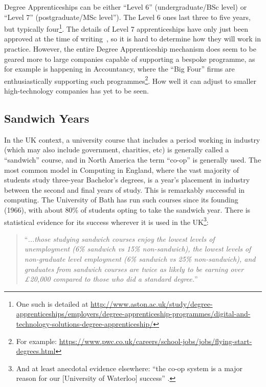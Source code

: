 \documentclass[conference]{IEEEtran}
\begin{document}
Degree Apprenticeships can be either ``Level 6'' (undergraduate/BSc
level) or ``Level 7'' (postgraduate/MSc level''). The Level 6 ones
last three to five years, but typically four\footnote{One such is
detailed at
\url{http://www.aston.ac.uk/study/degree-apprenticeships/employers/degree-apprenticeship-programmes/digital-and-technology-solutions-degree-apprenticeship/}}. The
details of Level 7 apprenticeships have only just been approved at the
time of writing~\cite{IfA2018a}, so it is hard to determine how they will work in
practice. However, the entire Degree Apprenticeship mechanism does
seem to be geared more to large companies capable of supporting a
bespoke programme, as for example is happening in Accountancy, where
the ``Big Four'' firms are enthusiastically supporting such
programmes\footnote{For example:
\url{https://www.pwc.co.uk/careers/school-jobs/jobs/flying-start-degrees.html}}. How
well it can adjust to smaller high-technology companies has yet to be
seen.

\subsection{Sandwich Years}

In the UK context, a university course that includes a period
working in industry (which may also include government, charities, etc) is
generally called a ``sandwich'' course, and in North America the term ``co-op''
is generally used. The most common model in Computing in England,
where the vast majority of students study three-year Bachelor's
degrees, is a year's placement in industry between the second and
final years of study. This is remarkably successful in computing. The
University of Bath has run such courses since its founding (1966),
with about 80\% of students opting to take the sandwich year. There is
statistical evidence for its success wherever it is used in the
UK\footnote{And at least anecdotal evidence elsewhere: ``the co-op
system is a major reason for our [University of Waterloo] success''
\cite{Watt2017a}.}:

\begin{quote} ``{\emph{...those studying sandwich courses enjoy the lowest levels
of unemployment (6\% sandwich vs 15\% non-sandwich), the lowest levels
of non-graduate level employment (6\% sandwich vs 25\% non-sandwich),
and graduates from sandwich courses are twice as likely to be earning
over \pounds20,000 compared to those who did a standard
degree.}}''~\cite{Shadbolt2016a}
\end{quote}
\end{document}
